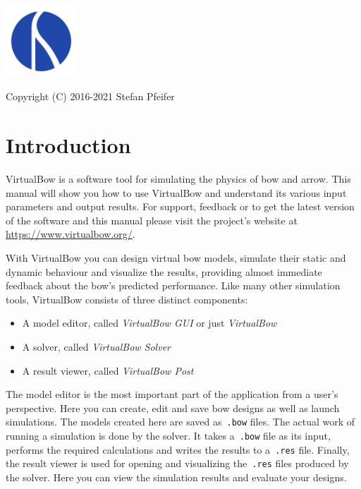 \documentclass[12pt]{article}
\newcommand{\version}{0.8}
\newcommand{\website}{\url{https://www.virtualbow.org/}}
\newcommand{\copyrights}{Copyright (C) 2016-2021 Stefan Pfeifer}
\begin{document}
\begin{titlepage}

\vspace*{5em}
\centering{\Huge\textbf{VirtualBow~v\version \\[1em] User Manual}}

\vspace{5em}

\centerline{\includegraphics[width=0.2\textwidth]{figures/logo.pdf}}

\null
\vfill
\centerline{\copyrights}

\thispagestyle{empty}
\end{titlepage}

\newpage
\tableofcontents

\newpage
\section{Introduction}
\bigskip

VirtualBow is a software tool for simulating the physics of bow and arrow.
This manual will show you how to use VirtualBow and understand its various input parameters and output results.
For support, feedback or to get the latest version of the software and this manual please visit the project's website at \website.

With VirtualBow you can design virtual bow models, simulate their static and dynamic behaviour and visualize the results, providing almost immediate feedback about the bow's predicted performance.
Like many other simulation tools, VirtualBow consists of three distinct components:

\begin{itemize}
\item A model editor, called \textit{VirtualBow GUI} or just \textit{VirtualBow}
\item A solver, called \textit{VirtualBow Solver}
\item A result viewer, called \textit{VirtualBow Post}
\end{itemize}

The model editor is the most important part of the application from a user's perspective.
Here you can create, edit and save bow designs as well as launch simulations.
The models created here are saved as~\texttt{.bow} files.
The actual work of running a simulation is done by the solver. It takes a~\texttt{.bow} file as its input, performs the required calculations and writes the results to a~\texttt{.res} file.
Finally, the result viewer is used for opening and visualizing the~\texttt{.res} files produced by the solver.
Here you can view the simulation results and evaluate your designs.
\end{document}
